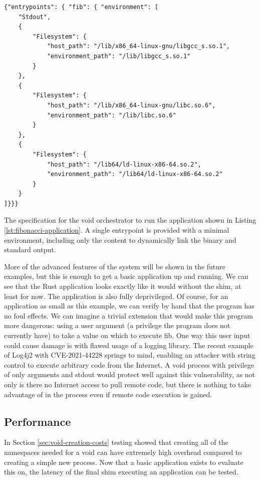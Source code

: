 \documentclass[12pt,a4paper,twoside]{report}
\begin{document}
\begin{listing}
\begin{verbatim}
{"entrypoints": { "fib": { "environment": [
    "Stdout",
    {
        "Filesystem": {
            "host_path": "/lib/x86_64-linux-gnu/libgcc_s.so.1",
            "environment_path": "/lib/libgcc_s.so.1"
        }
    },
    {
        "Filesystem": {
            "host_path": "/lib/x86_64-linux-gnu/libc.so.6",
            "environment_path": "/lib/libc.so.6"
        }
    },
    {
        "Filesystem": {
            "host_path": "/lib64/ld-linux-x86-64.so.2",
            "environment_path": "/lib64/ld-linux-x86-64.so.2"
        }
    }
]}}}
\end{verbatim}

\caption{The specification for the void orchestrator to run the application shown in Listing \ref{lst:fibonacci-application}. A single entrypoint is provided with a minimal environment, including only the content to dynamically link the binary and standard output.}
\label{lst:fibonacci-application-spec}
\end{listing}

More of the advanced features of the system will be shown in the future examples, but this is enough to get a basic application up and running. We can see that the Rust application looks exactly like it would without the shim, at least for now. The application is also fully deprivileged. Of course, for an application as small as this example, we can verify by hand that the program has no foul effects. We can imagine a trivial extension that would make this program more dangerous: using a user argument (a privilege the program does not currently have) to take a value on which to execute fib. One way this user input could cause damage is with flawed usage of a logging library. The recent example of Log4j2 with CVE-2021-44228 springs to mind, enabling an attacker with string control to execute arbitrary code from the Internet. A void process with privilege of only arguments and stdout would protect well against this vulnerability, as not only is there no Internet access to pull remote code, but there is nothing to take advantage of in the process even if remote code execution is gained.

\subsection{Performance}
\label{sec:fib-performance}

In Section \ref{sec:void-creation-costs} testing showed that creating all of the namespaces needed for a void can have extremely high overhead compared to creating a simple new process. Now that a basic application exists to evaluate this on, the latency of the final shim executing an application can be tested.
\end{document}
